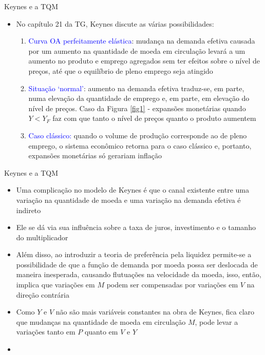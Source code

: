 \documentclass[10pt]{beamer}
\begin{document}
\begin{frame}{Keynes e a TQM}
    \begin{itemize}
        \item No capítulo 21 da TG, Keynes discute as várias possibilidades:\medskip
        \begin{enumerate}
        \item \textcolor{blue}{Curva OA perfeitamente elástica}: mudança na demanda efetiva causada por um aumento na quantidade de moeda em circulação levará a um aumento no produto e emprego agregados sem ter efeitos sobre o nível de preços, até que o equilíbrio de pleno emprego seja atingido
        \medskip
        \item \textcolor{blue}{Situação `normal'}: aumento na demanda efetiva traduz-se, em parte, numa elevação da quantidade de emprego e, em parte, em elevação do nível de preços. Caso da Figura \ref{fig1} - expansões monetárias quando $Y < Y_F$ faz com que tanto o nível de preços quanto o produto aumentem
        \medskip
        \item \textcolor{blue}{Caso clássico:} quando o volume de produção corresponde ao de pleno emprego, o sistema econômico retorna para o caso clássico e, portanto, expansões monetárias só gerariam inflação
        \end{enumerate}
    \end{itemize}
\end{frame}

\begin{frame}{Keynes e a TQM}
    \begin{itemize}
        \item Uma complicação no modelo de Keynes é que o canal existente entre uma variação na quantidade de moeda e uma variação na demanda efetiva é indireto
        \bigskip
        \item Ele se dá via sua influência sobre a taxa de juros, investimento e o tamanho do multiplicador
        \bigskip
        \item Além disso, ao introduzir a teoria de preferência pela liquidez permite-se a possibilidade de que a função de demanda por moeda possa ser deslocada de maneira inesperada, causando flutuações na velocidade da moeda, isso, então, implica que variações em $M$ podem ser compensadas por variações em $V$ na direção contrária
        \bigskip
        \item Como $Y$ e $V$ não são mais variáveis constantes na obra de Keynes, fica claro que mudanças na quantidade de moeda em circulação $M$, pode levar a variações tanto em $P$ quanto em $V$ e $Y$
        \bigskip
        \item {}
    \end{itemize}
\end{frame}
\end{document}
